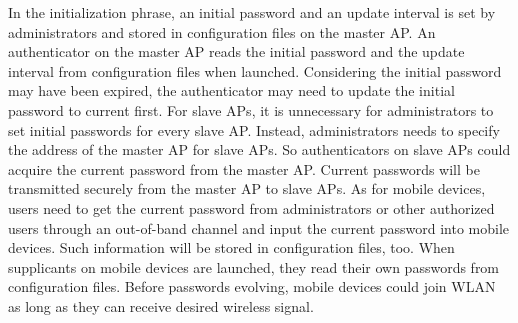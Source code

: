 In the initialization phrase, an initial password and an update interval is set by administrators and stored in configuration files on the master AP. An authenticator on the master AP reads the initial password and the update interval from configuration files when launched. Considering the initial password may have been expired, the authenticator may need to update the initial password to current first. For slave APs, it is unnecessary for administrators to set initial passwords for every slave AP. Instead, administrators needs to specify the address of the master AP for slave APs. So authenticators on slave APs could acquire the current password from the master AP. Current passwords will be transmitted securely from the master AP to slave APs. As for mobile devices, users need to get the current password from administrators or other authorized users through an out-of-band channel and input the current password into mobile devices. Such information will be stored in configuration files, too. When supplicants on mobile devices are launched, they read their own passwords from configuration files. Before passwords evolving, mobile devices could join WLAN as long as they can receive desired wireless signal. 

